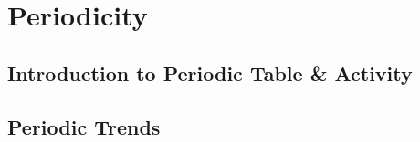 \documentclass[../hchem.tex]{subfiles}
\begin{document}
\chapter{Periodicity}
\section{Introduction to Periodic Table \& Activity}
\section{Periodic Trends}
\end{document}
